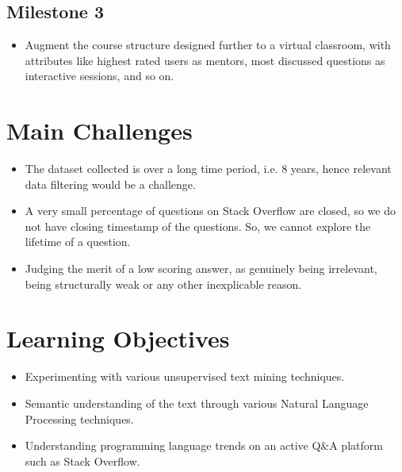 \documentclass{article}
\begin{document}
\subsection{Milestone 3}
\begin{itemize}
\item Augment the course structure designed further to a virtual classroom, with attributes like highest rated users as mentors, most discussed questions as interactive sessions, and so on.

\end{itemize}



\newpage
\section{Main Challenges}
\begin{itemize}
\item The dataset collected is over a long time period, i.e. 8 years, hence relevant data filtering would be a challenge.
\item A very small percentage of questions on Stack Overflow are closed, so we do not have closing timestamp of the questions. So, we cannot explore the lifetime of a question.
\item Judging the merit of a low scoring answer, as genuinely being irrelevant,  being structurally weak or any other inexplicable reason.
\end{itemize} 


\section{Learning Objectives}
\begin{itemize}
\item Experimenting with various unsupervised text mining techniques.
\item Semantic understanding of the text through various Natural Language Processing techniques.
\item Understanding  programming language trends on an active Q\&A platform such as Stack Overflow.
\end{itemize}
\end{document}
